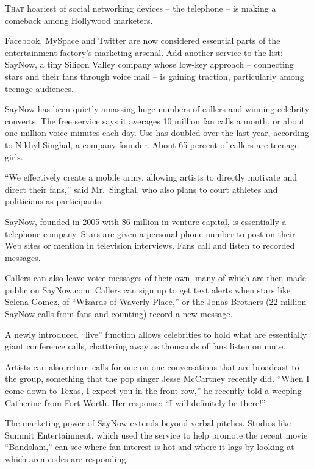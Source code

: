 ﻿\documentclass[12pt]{article}
\begin{document}
\lettrine{T}{hat} hoariest of social networking devices -- the telephone -- is making a comeback
among Hollywood marketers.

Facebook, MySpace and Twitter are now considered essential parts of the entertainment factory's
marketing arsenal. Add another service to the list: SayNow, a tiny Silicon Valley company whose
low-key approach -- connecting stars and their fans through voice mail -- is gaining traction,
particularly among teenage audiences.

SayNow has been quietly amassing huge numbers of callers and winning celebrity converts. The free
service says it averages 10 million fan calls a month, or about one million voice minutes each day.
Use has doubled over the last year, according to Nikhyl Singhal, a company founder. About 65 percent
of callers are teenage girls.

``We effectively create a mobile army, allowing artists to directly motivate and direct their
fans,'' said Mr.~Singhal, who also plans to court athletes and politicians as participants.

SayNow, founded in 2005 with \$6 million in venture capital, is essentially a telephone company.
Stars are given a personal phone number to post on their Web sites or mention in television
interviews. Fans call and listen to recorded messages.

Callers can also leave voice messages of their own, many of which are then made public on
SayNow.com. Callers can sign up to get text alerts when stars like Selena Gomez, of ``Wizards of
Waverly Place,'' or the Jonas Brothers (22 million SayNow calls from fans and counting) record a new
message.

A newly introduced ``live'' function allows celebrities to hold what are essentially giant
conference calls, chattering away as thousands of fans listen on mute.

Artists can also return calls for one-on-one conversations that are broadcast to the group,
something that the pop singer Jesse McCartney recently did. ``When I come down to Texas, I expect
you in the front row,'' he recently told a weeping Catherine from Fort Worth. Her response: ``I will
definitely be there!''

The marketing power of SayNow extends beyond verbal pitches. Studios like Summit Entertainment,
which used the service to help promote the recent movie ``Bandslam,'' can see where fan interest is
hot and where it lags by looking at which area codes are responding.
\end{document}
